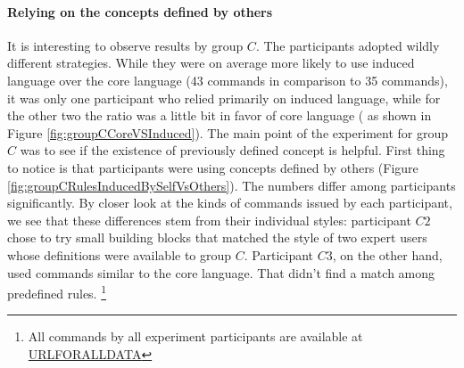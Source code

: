 \paragraph*{\textbf{Relying on the concepts defined by others}} It is interesting to observe results by group $C$. The participants adopted wildly different strategies. While they were on average more likely to use induced language over the core language (43 commands in comparison to 35 commands), it was only one participant who relied primarily on induced language, while for the other two the ratio was a little bit in favor of core language ( as shown in Figure \ref{fig:groupCCoreVSInduced}). The main point of the experiment for group $C$ was to see if the existence of previously defined concept is helpful. First thing to notice is that participants were using concepts defined by others (Figure \ref{fig:groupCRulesInducedBySelfVsOthers}). The numbers differ among participants significantly. By closer look at the kinds of commands issued by each participant, we see that these differences stem from their individual styles: participant $C2$ chose to try small building blocks that matched the style of two expert users whose definitions were available to group $C$. Participant $C3$, on the other hand, used commands similar to the core language. That didn't find a match among predefined rules. \footnote{All commands by all experiment participants are available at \url{URLFORALLDATA}}

